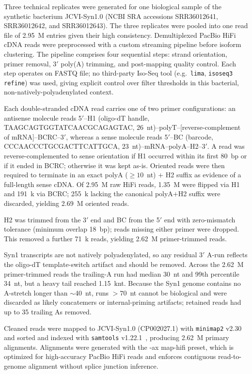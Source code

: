 Three technical replicates were generated for one biological sample of the synthetic bacterium JCVI-Syn1.0 (NCBI SRA accessions SRR36012641, SRR36012642, and SRR36012643).
The three replicates were pooled into one read file of 2.95~M entries given their high consistency.
Demultiplexed PacBio HiFi cDNA reads were preprocessed with a custom streaming pipeline before isoform clustering.
The pipeline comprises four sequential steps: strand orientation, primer removal, 3$'$ poly(A) trimming, and post-mapping quality control.
Each step operates on FASTQ file; no third-party Iso-Seq tool (e.g.\ \texttt{lima}, \texttt{isoseq3 refine}) was used, giving explicit control over filter thresholds in this bacterial, non-natively-polyadenylated context.

Each double-stranded cDNA read carries one of two primer configurations: an antisense molecule reads 5$'$--H1 (oligo-dT handle, TAAGCAGTGGTATCAACGCAGAGTAC, 26~nt)--polyT--[reverse-complement of mRNA]--BCRC--3$'$, whereas a sense molecule reads 5$'$--BC (barcode, CCCAACCCTGCGACTTCATTGCA, 23~nt)--mRNA--polyA--H2--3$'$.
A read was reverse-complemented to sense orientation if H1 occurred within its first 80~bp or if it ended in BCRC; otherwise it was kept as-is.
Oriented reads were then required to terminate in an exact polyA ($\geq 10$~nt) $+$ H2 suffix as evidence of a full-length sense cDNA.
Of 2.95~M raw HiFi reads, 1.35~M were flipped via H1 and 191~k via BCRC; 255~k lacking the canonical polyA$+$H2 suffix were discarded, yielding 2.69~M oriented reads.

H2 was trimmed from the 3$'$ end and BC from the 5$'$ end with zero-mismatch tolerance (minimum overlap 18~bp); reads missing either primer were dropped.
This removed a further 71~k reads, yielding 2.62~M primer-trimmed reads.

Syn1 transcripts are not natively polyadenylated, so any residual 3$'$ A-run reflects the oligo-dT template-switch artifact and should be removed.
Across the 2.62~M primer-trimmed reads the trailing-A run had median 30~nt and 99th percentile 34~nt, but a heavy tail reached 1.15~knt.
Because the Syn1 genome contains no A-stretch longer than $\sim$40~nt, runs $>70$~nt cannot be biological and were discarded as likely concatemers or internal-priming artifacts; retained reads had up to 35 trailing As removed.

Cleaned reads were mapped to JCVI-Syn1.0 (CP002027.1) with \texttt{minimap2} v2.30~\cite{li_minimap2_2018} and sorted and indexed with \texttt{samtools} v1.22.1~\cite{li_sequence_2009}, producing 2.62~M primary alignments.
Alignments were generated with the -ax map-hifi preset, which is optimized for high-accuracy PacBio HiFi reads and enforces contiguous read-to-genome alignment without splice junction inference.

